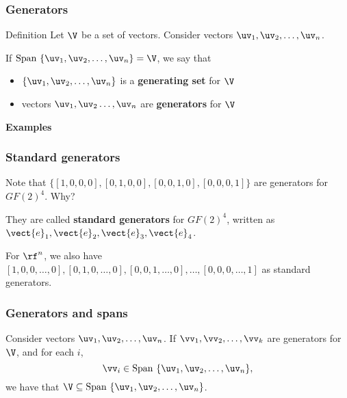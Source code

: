 \begin{frame}
  \frametitle{Generators}

  \begin{block}{Definition}
    Let $\V$ be a set of vectors.  Consider vectors $\uv_1,\uv_2,\ldots,\uv_n$.

    If $\mathrm{Span}\ \{\uv_1,\uv_2,\ldots,\uv_n\} = \V$, we say that
    \begin{itemize}
    \item $\{\uv_1,\uv_2,\ldots,\uv_n\}$ is a {\bf generating set} for $\V$
    \item vectors $\uv_1,\uv_2\ldots,\uv_n$ are {\bf generators} for $\V$
    \end{itemize}
  \end{block}

  \pause

  {\bf Examples}
  \vspace{1.5in}
\end{frame}

\begin{frame}
  \frametitle{Standard generators}

  Note that $\{[1,0,0,0], [0,1,0,0], [0,0,1,0], [0,0,0,1]\}$ are
  generators for $GF(2)^4$.  Why?

  \vspace{0.5in}
  \pause

  They are called {\bf standard generators} for $GF(2)^4$, written as $\vect{e}_1,\vect{e}_2,\vect{e}_3,\vect{e}_4$.
  \pause

  \vspace{0.2in}

  For $\rf^n$, we also have
  $[1,0,0,\ldots,0],[0,1,0,\ldots,0],[0,0,1,\ldots,0],\ldots,[0,0,0,\ldots,1]$
  as standard generators.
  
\end{frame}

\begin{frame}
  \frametitle{Generators and spans}
  \begin{lemma}
    Consider vectors $\uv_1,\uv_2,\ldots,\uv_n$.
    If $\vv_1,\vv_2,\ldots,\vv_k$ are generators for $\V$, and for each $i$,
    \[
    \vv_i\in \mathrm{Span}\ \{\uv_1,\uv_2,\ldots,\uv_n\},
    \]
    we have that $\V \subseteq \mathrm{Span}\ \{\uv_1,\uv_2,\ldots,\uv_n\}$.
  \end{lemma}

  \vspace{2in}
\end{frame}

